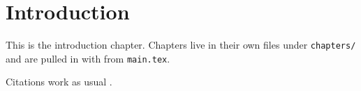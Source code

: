 \chapter{Introduction}

This is the introduction chapter. Chapters live in their own files under
\texttt{chapters/} and are pulled in with \verb|| from \texttt{main.tex}.

Citations work as usual \cite{knuth1984}.
